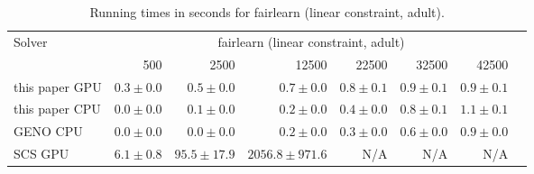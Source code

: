 
\begin{table}[h!]
  \begin{center}
  \small
  \begin{tabular}{l*{7}{r}}
    \toprule
    \multirow{2}{*}{Solver} & \multicolumn{6}{c}{fairlearn (linear constraint, adult)} \\
    \cmidrule{2-7}
    & 500 & 2500 & 12500 & 22500 & 32500 & 42500 \\
    \midrule
    this paper GPU & $0.3\pm 0.0$ & $0.5\pm 0.0$   & $0.7\pm 0.0$       & $0.8\pm 0.1$ & $0.9\pm 0.1$ & $0.9\pm 0.1$ \\
    this paper CPU & $0.0\pm 0.0$ & $0.1\pm 0.0$   & $0.2\pm 0.0$       & $0.4\pm 0.0$ & $0.8\pm 0.1$ & $1.1\pm 0.1$ \\
    GENO CPU       & $0.0\pm 0.0$ & $0.0\pm 0.0$   & $0.2\pm 0.0$       & $0.3\pm 0.0$ & $0.6\pm 0.0$ & $0.9\pm 0.0$ \\
    SCS GPU        & $6.1\pm 0.8$ & $95.5\pm 17.9$ & $2056.8\pm 971.6$  & N/A & N/A & N/A  \\
    \bottomrule
  \end{tabular}%
  \caption{Running times in seconds for fairlearn (linear constraint, adult).}
  \end{center}
\end{table}

